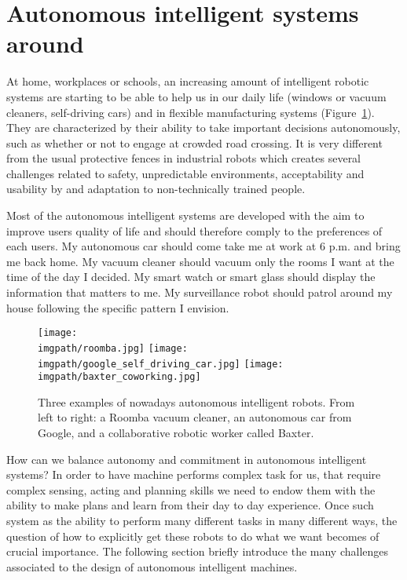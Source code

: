 \section{Autonomous intelligent systems around}

At home, workplaces or schools, an increasing amount of intelligent robotic systems are starting to be able to help us in our daily life (windows or vacuum cleaners, self-driving cars) \cite{gates2007robot} and in flexible manufacturing systems \cite{baxter} (Figure~\ref{fig:introduction:robots}). They are characterized by their ability to take important decisions autonomously, such as whether or not to engage at crowded road crossing. It is very different from the usual protective fences in industrial robots which creates several challenges related to safety, unpredictable environments, acceptability and usability by and adaptation to non-technically trained people. 

Most of the autonomous intelligent systems are developed with the aim to improve users quality of life and should therefore comply to the preferences of each users. My autonomous car should come take me at work at 6 p.m. and bring me back home. My vacuum cleaner should vacuum only the rooms I want at the time of the day I decided. My smart watch or smart glass should display the information that matters to me. My surveillance robot should patrol around my house following the specific pattern I envision.

\begin{figure}[!htbp]
    \centering
    \texttt{[image: \\imgpath/roomba.jpg]}
    \texttt{[image: \\imgpath/google\_self\_driving\_car.jpg]}
    \texttt{[image: \\imgpath/baxter\_coworking.jpg]}
    \caption{Three examples of nowadays autonomous intelligent robots. From left to right: a Roomba vacuum cleaner, an autonomous car from Google, and a collaborative robotic worker called Baxter.}
    \label{fig:introduction:robots}
\end{figure}

How can we balance autonomy and commitment in autonomous intelligent systems? In order to have machine performs complex task for us, that require complex sensing, acting and planning skills we need to endow them with the ability to make plans and learn from their day to day experience. Once such system as the ability to perform many different tasks in many different ways, the question of how to explicitly get these robots to do what we want becomes of crucial importance. The following section briefly introduce the many challenges associated to the design of autonomous intelligent machines.


